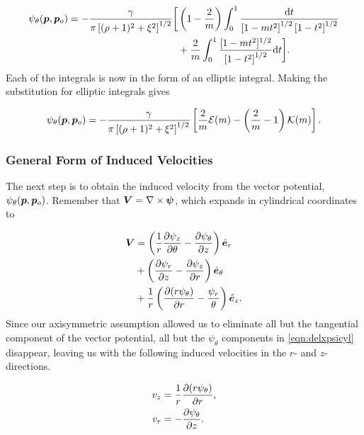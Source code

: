 \begin{equation}
    \begin{split}
        \psi_\theta(\bm{p},\bm{p}_o) = -\frac{\gamma}{\pi \left[(\rho+1)^2 + \xi^2\right]^{1/2}} \bigg[
        & \left(1-\frac{2}{m}\right) \int_{0}^{1} \frac{\mathrm{d}{t} }{\left[1 - m t^2 \right]^{1/2} \left[1-t^2\right]^{1/2}} \\
        & +\frac{2}{m} \int_{0}^{1} \frac{ [1 - mt^2]^{1/2} }{\left[1-t^2\right]^{1/2}} \mathrm{d}{t}\bigg].
    \end{split}
\end{equation}
%
Each of the integrals is now in the form of an elliptic integral.
%
Making the substitution for elliptic integrals gives

\begin{equation}
    \psi_\theta(\bm{p},\bm{p}_o) = -\frac{\gamma}{\pi \left[(\rho+1)^2 + \xi^2\right]^{1/2}} \left[  \frac{2}{m} \mathcal{E}(m) -\left(\frac{2}{m}-1\right)\mathcal{K}(m)  \right].
\end{equation}

\subsubsection{General Form of Induced Velocities}

The next step is to obtain the induced velocity from the vector potential, \(\psi_\theta(\bm{p},\bm{p}_o)\).
%
Remember that \(\bm{V} = \nabla \times \bm{\psi}\), which expands in cylindrical coordinates to

\begin{equation}
    \label{eqn:delxpsicyl}
    \begin{split}
        \bm{V} &= \left(\frac{1}{r}\frac{\partial \psi_z}{\partial \theta} - \frac{\partial \psi_\theta}{\partial z}\right)\hat{\bm{e}}_r \\
                 &+ \left(\frac{\partial \psi_r}{\partial z} - \frac{\partial \psi_z}{\partial r}\right)\hat{\bm{e}}_\theta \\
                 &+\frac{1}{r} \left(\frac{\partial (r \psi_\theta)}{\partial r} - \frac{\psi_r}{\theta}\right)\hat{\bm{e}}_z.
    \end{split}
\end{equation}
%
Since our axisymmetric assumption allowed us to eliminate all but the tangential component of the vector potential, all but the \(\psi_\theta\) components in \cref{eqn:delxpsicyl} disappear, leaving us with the following induced velocities in the \(r\)- and \(z\)-directions.

\begin{subequations}
\begin{align}
    v_z &= \frac{1}{r}\frac{\partial (r\psi_\theta)}{\partial r}, \\
    v_r &= -\frac{\partial \psi_\theta}{\partial z}.
\end{align}
\end{subequations}

